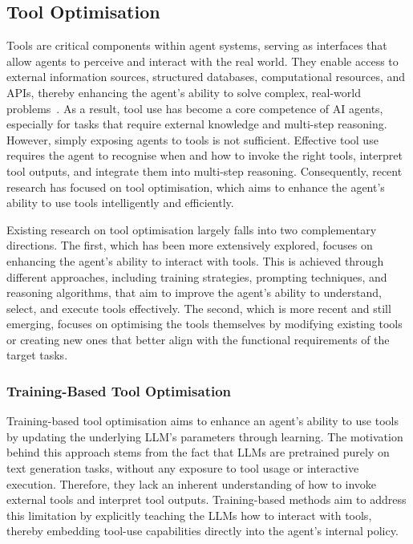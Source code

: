 \documentclass[]{selfevolagent}
\theoremstyle{plain}
\theoremstyle{definition}
\theoremstyle{remark}
\begin{document}
\subsection{Tool Optimisation}
Tools are critical components within agent systems, serving as interfaces that allow agents to perceive and interact with the real world. They enable access to external information sources, structured databases, computational resources, and APIs, thereby enhancing the agent's ability to solve complex, real-world problems~\citep{patil2024gorilla, yang2023gpt4tools, guo2024stabletoolbench}. As a result, tool use has become a core competence of AI agents, especially for tasks that require external knowledge and multi-step reasoning. However, simply exposing agents to tools is not sufficient. Effective tool use requires the agent to recognise when and how to invoke the right tools, interpret tool outputs, and integrate them into multi-step reasoning. Consequently, recent research has focused on tool optimisation, which aims to enhance the agent's ability to use tools intelligently and efficiently. 

Existing research on tool optimisation largely falls into two complementary directions. The first, which has been more extensively explored, focuses on enhancing the agent's ability to interact with tools. This is achieved through different approaches, including {training strategies, prompting techniques, and reasoning algorithms}, that aim to improve the agent's ability to understand, select, and execute tools effectively. 
The second, which is more recent and still emerging, focuses on optimising the tools themselves by modifying existing tools or creating new ones that better align with the functional requirements of the target tasks. 

\subsubsection{Training-Based Tool Optimisation} 
Training-based tool optimisation aims to enhance an agent's ability to use tools by updating the underlying LLM's parameters through learning. The motivation behind this approach stems from the fact that LLMs are pretrained purely on text generation tasks, without any exposure to tool usage or interactive execution. Therefore, they lack an inherent understanding of how to invoke external tools and interpret tool outputs. Training-based methods aim to address this limitation by explicitly teaching the LLMs how to interact with tools, thereby embedding tool-use capabilities directly into the agent’s internal policy. 
\end{document}
